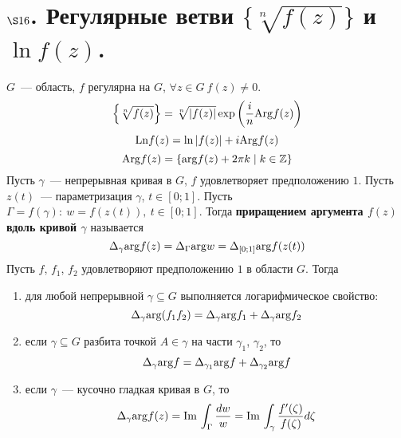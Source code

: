 \section{$\S 16$. Регулярные ветви $\{\sqrt[n]{f(z)}\}$ и $\ln f(z)$.}
\sug
$G$~--- область, $f$ регулярна на $G$, $\forall z \in G \ f(z) \neq 0$.
\begin{equation}\label{(16.1)}
    \left\{ \sqrt[n]{f(z)} \right\} = \sqrt[n]{\left| f(z) \right|} \exp \left( \frac{i}{n}\mathrm{Arg} f(z) \right)
\end{equation}
\begin{equation}\label{(16.2)}
    \mathrm{Ln} f(z) = \ln \left| f(z) \right| +i \mathrm{Arg} f(z)
\end{equation}
\begin{equation}\label{(16.3)}
    \mathrm{Arg} f(z) = \left\{ \mathrm{arg} f(z) + 2 \pi k \mid k \in \mathbb{Z} \right\}
\end{equation}
\Def
Пусть $\gamma$~--- непрерывная кривая в $G$, $f$ удовлетворяет предположению
$1$. Пусть $z(t)$~--- параметризация $\gamma$, $t \in [0;1]$. Пусть $\Gamma =
f(\gamma): \ w = f(z(t)), \ t \in [0;1]$. Тогда \textbf{приращением аргумента
  $f(z)$ вдоль кривой $\gamma$} называется
\begin{equation}\label{(16.4)}
    \Delta_{\gamma}\mathrm{arg} f(z) = \Delta_\Gamma\mathrm{arg} w = \Delta_{[0;1]}\mathrm{arg} f(z(t))
\end{equation}
\lemma
Пусть $f$, $f_1$, $f_2$ удовлетворяют предположению $1$ в области $G$. Тогда
\begin{enumerate}
    \item для любой непрерывной $\gamma \subseteq G$ выполняется логарифмическое
    свойство:
    \begin{equation}\label{(16.5)}
        \Delta_{\gamma}\mathrm{arg} (f_1f_2) = \Delta_\gamma\mathrm{arg} f_1 + \Delta_{\gamma}\mathrm{arg} f_2
    \end{equation}
    \item если $\gamma \subseteq G$ разбита точкой $A \in \gamma$ на части
    $\gamma_1$, $\gamma_2$, то
    \begin{equation}\label{(16.6)}
        \Delta_{\gamma}\mathrm{arg} f = \Delta_{\gamma_1}\mathrm{arg} f + \Delta_{\gamma_2}\mathrm{arg} f
    \end{equation}
    \item если $\gamma$~--- кусочно гладкая кривая в $G$, то
    \begin{equation}\label{(16.7)}
        \Delta_{\gamma}\mathrm{arg} f(z) = \mathrm{Im}\, \int_\Gamma \frac{dw}{w} = \mathrm{Im}\, \int_{\gamma} \frac{f'(\zeta)}{f(\zeta)}d\zeta
    \end{equation}
\end{enumerate}
